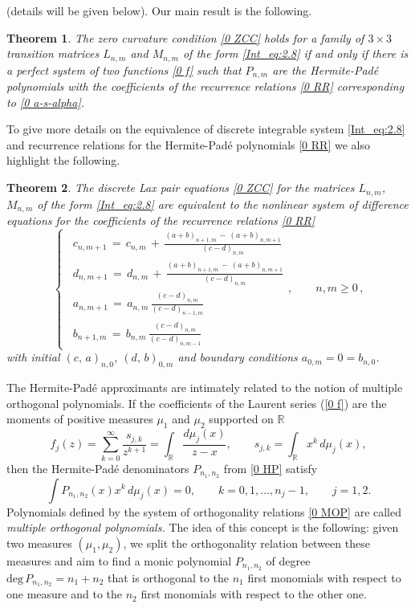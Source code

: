 \documentclass{amsart}
\newtheorem{theorem}{Theorem}[section]
\theoremstyle{remark}
\numberwithin{equation}{section}
\begin{document}
(details will be given below).
Our main result is the following.
\begin{theorem} \label{T0 1}
The zero curvature condition \eqref{0 ZCC}
holds for a family of $3\times 3$ transition matrices $L_{n,m}$ and $M_{n,m}$ of the form \eqref{Int_eq:2.8} if and only if there is a perfect system of two functions \eqref{0 f} such that  $P_{n,m}$ are the {Her\-mite-Pad\'e}{} polynomials with the coefficients of the recurrence relations \eqref{0 RR} corresponding to \eqref{0 a-s-alpha}.
\end{theorem}
To give more details on the equivalence of discrete integrable system \eqref{Int_eq:2.8} and recurrence relations for the {Her\-mite-Pad\'e}{} polynomials \eqref{0 RR} we also highlight the following.
\begin{theorem} \label{T0 2}
 The discrete Lax pair equations \eqref{0 ZCC} for the matrices $L_{n,m}$, $M_{n,m}$ of the form \eqref{Int_eq:2.8} are equivalent to the nonlinear system of difference equations for the coefficients of the recurrence relations \eqref{0 RR}
\begin{equation}  \label{0 DiffEq}
\begin{cases}
    \,\,\,c_{n,m+1}\,=\, c_{n,m}\,+\,\displaystyle\frac{(a+b)_{n+1,m}\,-\,(a+b)_{n,m+1}}{(c-d)_{n,m}}  \\
    \,\,\,d_{n,m+1}\,=\, d_{n,m}\,+\,\displaystyle\frac{(a+b)_{n+1,m}\,-\,(a+b)_{n,m+1}}{(c-d)_{n,m}}  \\
    \,\,\,a_{n,m+1}\,=\,a_{n,m} \,\displaystyle\frac{(c-d)_{n,m}}{(c-d)_{n-1,m}} \\
    \,\,\,b_{n+1,m}\,=\,b_{n,m} \,\displaystyle\frac{(c-d)_{n,m}}{(c-d)_{n,m-1}}
\end{cases},\qquad n,m \geq 0\,,
\end{equation}
with initial $(c,\,a)_{n,0}$, $(d,\,b)_{0,m}$   and  boundary conditions $a_{0,m} = 0 = b_{n,0}$.
\end{theorem}

The {Her\-mite-Pad\'e}{} approximants are intimately related to the notion of multiple orthogonal polynomials.
If the coefficients of the Laurent series (\ref{0 f}) are the moments of positive measures $\mu_1$ and  $\mu_2$
supported on $\mathbb{R}$
\begin{equation}   \label{0 fMOP}
   f_j(z) = \sum_{k=0}^\infty \frac{s_{j,k}}{z^{k+1}} = \int_{\mathbb{R}} \frac{d\mu_j(x)}{z-x}, \qquad
  s_{j,k} = \int_{\mathbb{R}} x^k\, d\mu_j(x),
\end{equation}
then the {Her\-mite-Pad\'e}{} denominators $P_{n_1,n_2}$ from \eqref{0 HP} satisfy
\begin{equation}  \label{0 MOP}
\int P_{n_1,n_2}(x) x^k\, d\mu_j(x) = 0, \qquad k=0,1,\ldots,n_j-1,\qquad  j=1,2.
\end{equation}
Polynomials  defined by the system of orthogonality relations \eqref{0 MOP} are called \textit{multiple orthogonal polynomials.} The idea of this concept is the following: given two measures $(\mu_1, \mu_2)$, we split the orthogonality relation between
these measures and aim to find a monic polynomial $P_{n_1,n_2}$ of degree $ \mbox{deg}\,P_{n_1,n_2}=n_1+n_2$ that is orthogonal to the $n_1$ first monomials with respect to one measure and to the $n_2$ first monomials with respect to the other one.
\end{document}
